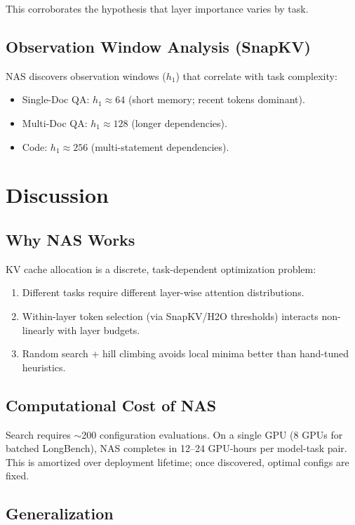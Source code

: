 \documentclass[11pt]{article}
\begin{document}
This corroborates the hypothesis that layer importance varies by task.

\subsection{Observation Window Analysis (SnapKV)}

NAS discovers observation windows ($h_1$) that correlate with task complexity:
\begin{itemize}
    \item Single-Doc QA: $h_1 \approx 64$ (short memory; recent tokens dominant).
    \item Multi-Doc QA: $h_1 \approx 128$ (longer dependencies).
    \item Code: $h_1 \approx 256$ (multi-statement dependencies).
\end{itemize}

\section{Discussion}

\subsection{Why NAS Works}

KV cache allocation is a discrete, task-dependent optimization problem:
\begin{enumerate}
    \item Different tasks require different layer-wise attention distributions.
    \item Within-layer token selection (via SnapKV/H2O thresholds) interacts non-linearly with layer budgets.
    \item Random search + hill climbing avoids local minima better than hand-tuned heuristics.
\end{enumerate}

\subsection{Computational Cost of NAS}

Search requires $\sim$200 configuration evaluations. On a single GPU (8 GPUs for batched LongBench), NAS completes in 12–24 GPU-hours per model-task pair. This is amortized over deployment lifetime; once discovered, optimal configs are fixed.

\subsection{Generalization}
\end{document}
